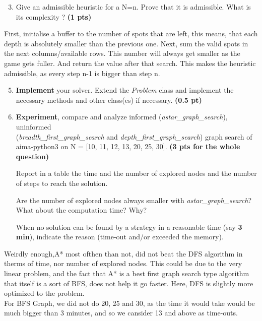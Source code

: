 \documentclass[11pt,a4paper]{report}
\begin{document}
\begin{enumerate}
\setcounter{enumi}{2}
\item Give an admissible heuristic for a N=n. Prove that it is admissible. What is its complexity ? \textbf{(1 pts)}
\end{enumerate}

\begin{answers}[5cm]
First, initialise a buffer to the number of spots that are left, this means, that each depth is absolutely smaller than the previous one. Next, sum the valid spots in the next columns/available rows. This number will always get smaller as the game gets fuller. And return the value after that search. This makes the heuristic admissible, as every step n-1 is bigger than step n.
\end{answers}



\begin{enumerate}
\setcounter{enumi}{4}
\item \textbf{Implement} your solver. Extend the \emph{Problem} class and implement 
		the necessary methods and other class(es) if necessary.  \textbf{(0.5 pt)}
\item \textbf{Experiment}, compare and analyze informed (\emph{astar\_graph\_search}), uninformed \\
    (\emph{breadth\_first\_graph\_search} and \emph{depth\_first\_graph\_search}) graph search of aima-python3 on N = [10, 11, 12, 13, 20, 25, 30]. \textbf{(3 pts for the whole question)}
		
		Report in a table the time and the number of explored nodes and the number of 
		steps to reach the solution.
		
		Are the number of explored nodes always smaller with 
		\emph{astar\_graph\_search}? 
		What about the computation time? 
		Why? 
		 
		 When no solution can be found by a strategy in a reasonable time (say \textbf{3 
		 min}), indicate the reason (time-out and/or exceeded the memory).
\end{enumerate}

\begin{answers}[8cm]
Weirdly enough,A* most ofthen than not, did not beat the DFS algorithm in therms of time, nor number of explored nodes. This could be due to the very linear problem, and the fact that A* is a best first graph search type algorithm that itself is a sort of BFS, does not help it go faster. Here, DFS is slightly more optimized to the problem.\\

For BFS Graph, we did not do 20, 25 and 30, as the time it would take would be much bigger than 3 minutes, and so we cansider 13 and above as time-outs.
\end{answers}
\end{document}
